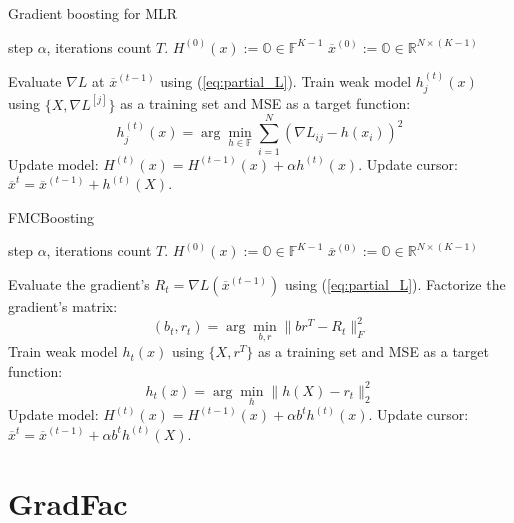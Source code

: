 \documentclass{article}
\begin{document}
\begin{algorithm}[tb]
   \caption{Gradient boosting for MLR}
   \label{alg:boost_mlr}
\begin{algorithmic}
    step $\alpha$, iterations count $T$.
   \STATE $H^{(0)}(x):= \mathbb{O} \in \mathbb{F}^{K-1}$ 
   \STATE $\overline{x}^{(0)} := \mathbb{O} \in \mathbb{R}^{N \times (K-1)}$ 

   		\STATE Evaluate $\nabla L$ at $\overline{x}^{(t-1)}$ using (\ref{eq:partial_L}).
   			\STATE Train weak model $h_{j}^{(t)}(x)$ using $\{X,\nabla L^{[j]}\}$ as a training set and MSE as a target function:
   			\[
				h_{j}^{(t)}(x)=\arg\min_{h \in \mathbb{F}} \sum_{i=1}^{N}\left(\nabla L_{ij}-h(x_{i})\right)^{2}
			\]
		\ENDFOR
		\STATE Update model: $H^{(t)}(x)=H^{(t-1)}(x)+\alpha h^{(t)}(x)$.
		\STATE Update cursor: $\overline{x}^{t} = \overline{x}^{(t-1)} + h^{(t)}(X)$.
   \ENDFOR
   
\end{algorithmic}
\end{algorithm}


\begin{algorithm}[tb]
   \caption{FMCBoosting}
   \label{alg:boost_fmcb}
\begin{algorithmic}
    step $\alpha$, iterations count $T$.
   \STATE $H^{(0)}(x):= \mathbb{O} \in \mathbb{F}^{K-1}$ 
   \STATE $\overline{x}^{(0)} := \mathbb{O} \in \mathbb{R}^{N \times (K-1)}$ 

   		\STATE Evaluate the gradient's $R_t=\nabla L(\overline{x}^{(t-1)})$ using (\ref{eq:partial_L}).
   		\STATE Factorize the gradient's matrix:
   			$$(b_{t},r_{t}) = \arg\min_{b,r} \|b r^T - R_t\|_F^2$$
		\STATE Train weak model $h_{t}(x)$ using $\{X,r^T\}$ as a training set and MSE as a target function:
		$$h_{t}(x) = \arg\min_{h} \|h(X) - r_{t}\|_2^2$$  	
		\STATE Update model: $H^{(t)}(x) = H^{(t-1)}(x) + \alpha b^t h^{(t)}(x)$.
		\STATE Update cursor: $\overline{x}^{t} = \overline{x}^{(t-1)} + \alpha b^t h^{(t)}(X)$.
   \ENDFOR
   
\end{algorithmic}
\end{algorithm}


\section{GradFac}
\end{document}
